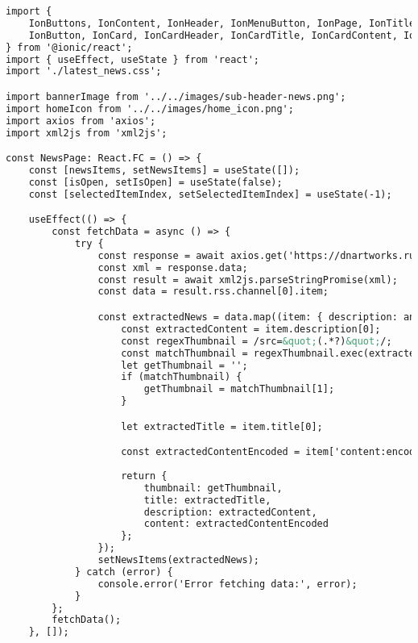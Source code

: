 \begin{lstlisting}[language=HTML, caption=latest\_news.tsx]
import {
    IonButtons, IonContent, IonHeader, IonMenuButton, IonPage, IonTitle, IonToolbar,
    IonButton, IonCard, IonCardHeader, IonCardTitle, IonCardContent, IonModal, useIonViewWillLeave, useIonViewDidEnter, IonBackButton, useIonViewWillEnter
} from '@ionic/react';
import { useEffect, useState } from 'react';
import './latest_news.css';

import bannerImage from '../../images/sub-header-news.png';
import homeIcon from '../../images/home_icon.png';
import axios from 'axios';
import xml2js from 'xml2js';

const NewsPage: React.FC = () => {
    const [newsItems, setNewsItems] = useState([]);
    const [isOpen, setIsOpen] = useState(false);
    const [selectedItemIndex, setSelectedItemIndex] = useState(-1);

    useEffect(() => {
        const fetchData = async () => {
            try {
                const response = await axios.get('https://dnartworks.rugbyindonesia.or.id/indonesianrugby/news/list.xml');
                const xml = response.data;
                const result = await xml2js.parseStringPromise(xml);
                const data = result.rss.channel[0].item;

                const extractedNews = data.map((item: { description: any[]; title: any[]; 'content:encoded': any[]; }) => {
                    const extractedContent = item.description[0];
                    const regexThumbnail = /src=&quot;(.*?)&quot;/;
                    const matchThumbnail = regexThumbnail.exec(extractedContent);
                    let getThumbnail = '';
                    if (matchThumbnail) {
                        getThumbnail = matchThumbnail[1];
                    }

                    let extractedTitle = item.title[0];

                    const extractedContentEncoded = item['content:encoded'][0];
                    
                    return {
                        thumbnail: getThumbnail,
                        title: extractedTitle,
                        description: extractedContent,
                        content: extractedContentEncoded
                    };
                });
                setNewsItems(extractedNews);
            } catch (error) {
                console.error('Error fetching data:', error);
            }
        };
        fetchData();
    }, []);


\end{lstlisting}
